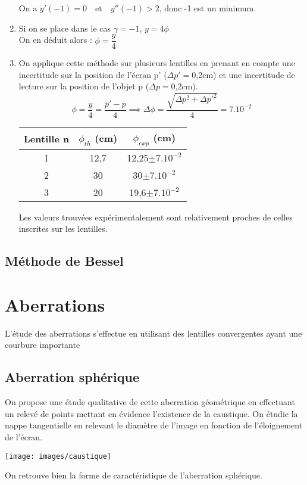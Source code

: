 \documentclass[12pt,a4paper]{article}
\begin{document}
\begin{enumerate}
\vspace*{+1em}
On a $y'(-1)=0 \quad \text{et} \quad y''(-1)>2$, donc -1 est un minimum.\\
\item Si on se place dans le cas $\gamma=-1$, $y=4\phi$\\
On en déduit alors : $\phi=\dfrac{y}{4}$
\item 
On applique cette méthode sur plusieurs lentilles en prenant en compte une incertitude sur la position de l'écran p' ($\Delta p'=$0,2cm) et une incertitude de lecture sur la position de l'objet p ($\Delta p=$0,2cm).
$$\phi=\dfrac{y}{4}=\dfrac{p'-p}{4}\implies \Delta \phi = \dfrac{\sqrt{\Delta p^2+\Delta p'^2}}{4}=7.10^{-2}$$
\begin{center}

\begin{tabular}{|c|c|c|}
	\hline 
	Lentille n & $\phi_{th}$ (cm) & $\phi_{exp}$ (cm) \\ 
	\hline 
	1 & 12,7 & 12,25$\pm7.10^{-2}$ \\ 
	\hline 
	2 & 30 & 30$\pm7.10^{-2}$ \\ 
	\hline 
	3 & 20 & 19,6$\pm7.10^{-2}$ \\ 
	\hline 
\end{tabular} 
\end{center}
Les valeurs trouvées expérimentalement sont relativement proches de celles inscrites sur les lentilles.
\end{enumerate}
\subsection{Méthode de Bessel}
\section{Aberrations}
L'étude des aberrations s'effectue en utilisant des lentilles convergentes ayant une courbure importante
\subsection{Aberration sphérique}
On propose une étude qualitative de cette aberration géométrique en effectuant un relevé de points mettant en évidence l'existence de la caustique. On étudie la nappe tangentielle en relevant le diamètre de l'image en fonction de l'éloignement de l'écran.
\begin{center}
	\texttt{[image: images/caustique]}
\end{center}
On retrouve bien la forme de caractéristique de l'aberration sphérique.
\end{document}
